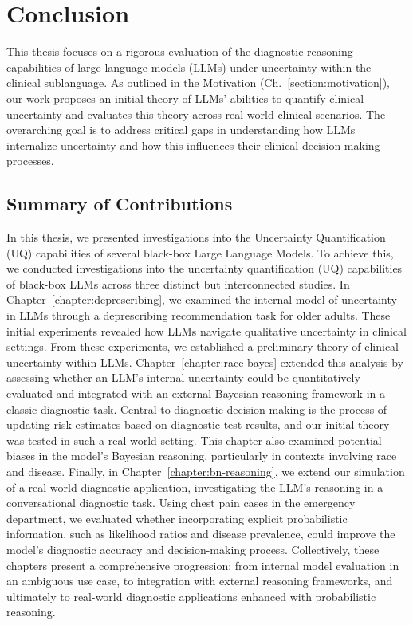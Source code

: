 \chapter{Conclusion} \label{chapter:conclusion}

This thesis focuses on a rigorous evaluation of the diagnostic reasoning capabilities of large language models (LLMs) under uncertainty within the clinical sublanguage. As outlined in the Motivation (Ch.~\ref{section:motivation}), our work proposes an initial theory of LLMs' abilities to quantify clinical uncertainty and evaluates this theory across real-world clinical scenarios. The overarching goal is to address critical gaps in understanding how LLMs internalize uncertainty and how this influences their clinical decision-making processes.

\section{Summary of Contributions}

In this thesis, we presented investigations into the Uncertainty Quantification (UQ) capabilities of several black-box Large Language Models. To achieve this, we conducted investigations into the uncertainty quantification (UQ) capabilities of black-box LLMs across three distinct but interconnected studies. In Chapter~\ref{chapter:deprescribing}, we examined the internal model of uncertainty in LLMs through a deprescribing recommendation task for older adults. These initial experiments revealed how LLMs navigate qualitative uncertainty in clinical settings. From these experiments, we established a preliminary theory of clinical uncertainty within LLMs. Chapter~\ref{chapter:race-bayes} extended this analysis by assessing whether an LLM’s internal uncertainty could be quantitatively evaluated and integrated with an external Bayesian reasoning framework in a classic diagnostic task. Central to diagnostic decision-making is the process of updating risk estimates based on diagnostic test results, and our initial theory was tested in such a real-world setting. This chapter also examined potential biases in the model’s Bayesian reasoning, particularly in contexts involving race and disease. Finally, in Chapter~\ref{chapter:bn-reasoning}, we extend our simulation of a real-world diagnostic application, investigating the LLM’s reasoning in a conversational diagnostic task. Using chest pain cases in the emergency department, we evaluated whether incorporating explicit probabilistic information, such as likelihood ratios and disease prevalence, could improve the model’s diagnostic accuracy and decision-making process. Collectively, these chapters present a comprehensive progression: from internal model evaluation in an ambiguous use case, to integration with external reasoning frameworks, and ultimately to real-world diagnostic applications enhanced with probabilistic reasoning.

